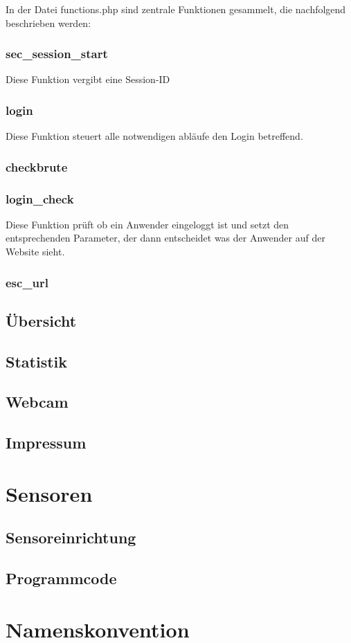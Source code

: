 In der Datei functions.php sind zentrale Funktionen gesammelt, die nachfolgend
beschrieben werden:

\subsubsection{sec_session_start}
Diese Funktion vergibt eine Session-ID

\subsubsection{login}
Diese Funktion steuert alle notwendigen abläufe den Login betreffend.

\subsubsection{checkbrute}

\subsubsection{login_check}
Diese Funktion prüft ob ein Anwender eingeloggt ist und setzt den entsprechenden
Parameter, der dann entscheidet was der Anwender auf der Website sieht.

\subsubsection{esc_url}


\subsection{Übersicht}

\subsection{Statistik}

\subsection{Webcam}

\subsection{Impressum}


\section{Sensoren}

\subsection{Sensoreinrichtung}

\subsection{Programmcode}

\section{Namenskonvention}
